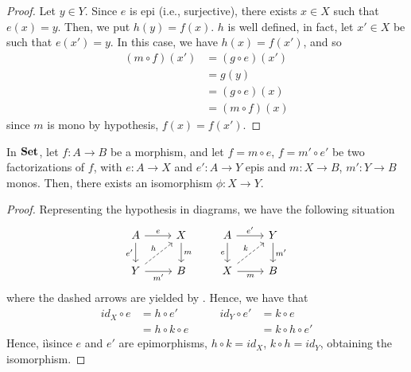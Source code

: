 \begin{proof}
	Let $y \in Y$. Since $e$ is epi (i.e., surjective), there exists $x \in X$ such that $e(x) = y$. Then, we put $h(y) = f(x)$. $h$ is well defined, in fact, let $x' \in X$ be such that $e(x') = y$. In this case, we have $h(x) = f(x')$, and so
	\begin{align*}
		(m \circ f) (x')  &= (g \circ e) (x') \\
				&= g(y)		\\
				&= (g \circ e) (x)	\\
				&= (m \circ f) (x)
	\end{align*}
	since $m$ is mono by hypothesis, $f(x) = f(x')$.
\end{proof}

\begin{cor}\label{cor:unique}
	In $\mathbf{Set}$, let $f:A \to B$ be a morphism, and let $f=m \circ e$, $f=m'\circ e'$ be two factorizations of $f$, with $e: A \to X$ and $e': A \to Y$ epis and $m: X \to B$, $m': Y \to B$ monos.
	Then, there exists an isomorphism $\phi: X \to Y$.
\end{cor}

\begin{proof}
	Representing the hypothesis in diagrams, we have the following situation
	\[\begin{tikzcd}
		A \ar[r, "e"] \ar[d, "e'"swap] & X \ar[d, "m"] & A \ar[r, "e'"] \ar[d, "e"swap] & Y \ar[d, "m'"] \\
		Y \ar[r, "m'"swap] \ar[ur, dashed, "h"] & B    & X \ar[r, "m"swap] \ar[ur, dashed, "k"] & B 
	\end{tikzcd}\]
	where the dashed arrows are yielded by . Hence, we have that
	\[\begin{split}
		id_X \circ e &= h \circ e' \\ &= h \circ k \circ e
	\end{split}\qquad\begin{split}
		id_Y \circ e' &= k \circ e \\ &= k \circ h \circ e'
	\end{split}\]
	Hence, iìsince $e$ and $e'$ are epimorphisms,  $h \circ k = id_X$, $k \circ h = id_Y$, obtaining the isomorphism.
\end{proof}

